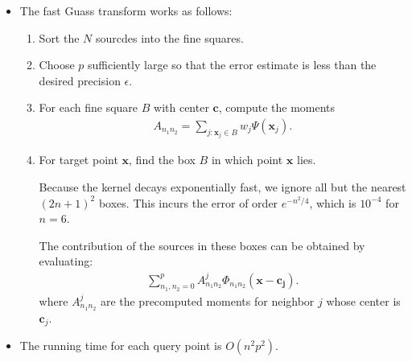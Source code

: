 \documentclass[10pt]{article}
\newcommand{\ve}[1]{\mathbf{#1}}
\begin{document}
\begin{itemize}
  \item The fast Guass transform works as follows:
  \begin{enumerate}
    \item Sort the $N$ sourcdes into the fine squares.
    \item Choose $p$ sufficiently large so that the error estimate is less than the desired precision $\epsilon$.
    \item For each fine square $B$ with center $\ve{c}$, compute the moments
    \begin{align*}
      A_{n_1 n_2} = \sum_{j: \ve{x}_j \in B} w_j \Psi(\ve{x}_j).
    \end{align*}
    \item For target point $\ve{x}$, find the box $B$ in which point $\ve{x}$ lies. 
    
    Because the kernel decays exponentially fast, we ignore all but the nearest $(2n+1)^2$ boxes. This incurs the error of order $e^{-n^2/4}$, which is $10^{-4}$ for $n = 6$. 
    
    The contribution of the sources in these boxes can be obtained by evaluating:
    \begin{align*}
      \sum_{n_1, n_2 = 0}^p A^j_{n_1 n_2} \Phi_{n_1n_2} (\ve{x} - \ve{c_j}).
    \end{align*}
    where $A^j_{n_1n_2}$ are the precomputed moments for neighbor $j$ whose center is $\ve{c}_j$.
  \end{enumerate}
  
  \item The running time for each query point is $O(n^2 p^2)$.
  
\end{itemize}

  

	
\end{document}

